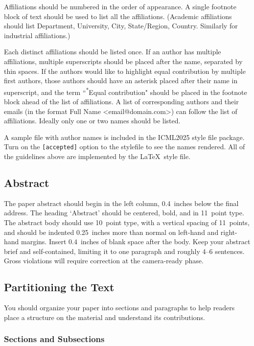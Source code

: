 \documentclass{article}
\theoremstyle{plain}
\theoremstyle{definition}
\theoremstyle{remark}
\begin{document}
Affiliations should be numbered in the order of appearance. A single footnote
block of text should be used to list all the affiliations. (Academic
affiliations should list Department, University, City, State/Region, Country.
Similarly for industrial affiliations.)

Each distinct affiliations should be listed once. If an author has multiple
affiliations, multiple superscripts should be placed after the name, separated
by thin spaces. If the authors would like to highlight equal contribution by
multiple first authors, those authors should have an asterisk placed after their
name in superscript, and the term ``\textsuperscript{*}Equal contribution"
should be placed in the footnote block ahead of the list of affiliations. A
list of corresponding authors and their emails (in the format Full Name
\textless{}email@domain.com\textgreater{}) can follow the list of affiliations.
Ideally only one or two names should be listed.

A sample file with author names is included in the ICML2025 style file
package. Turn on the \texttt{[accepted]} option to the stylefile to
see the names rendered. All of the guidelines above are implemented
by the \LaTeX\ style file.

\subsection{Abstract}

The paper abstract should begin in the left column, 0.4~inches below the final
address. The heading `Abstract' should be centered, bold, and in 11~point type.
The abstract body should use 10~point type, with a vertical spacing of
11~points, and should be indented 0.25~inches more than normal on left-hand and
right-hand margins. Insert 0.4~inches of blank space after the body. Keep your
abstract brief and self-contained, limiting it to one paragraph and roughly 4--6
sentences. Gross violations will require correction at the camera-ready phase.

\subsection{Partitioning the Text}

You should organize your paper into sections and paragraphs to help
readers place a structure on the material and understand its
contributions.

\subsubsection{Sections and Subsections}
\end{document}
